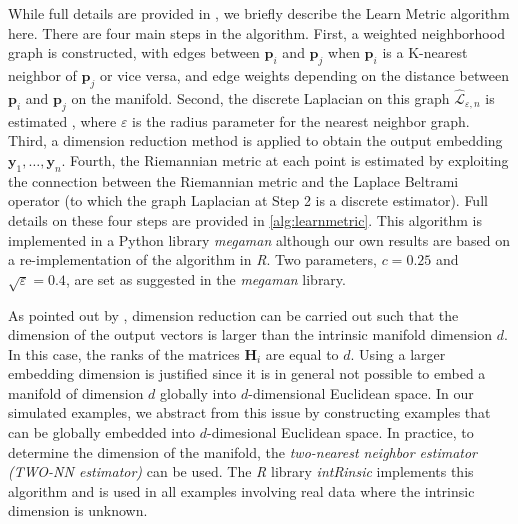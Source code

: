\documentclass[11pt,a4paper,]{article}
\begin{document}
While full details are provided in \textcite{Perrault-Joncas2013-pq}, we briefly describe the Learn Metric algorithm here. There are four main steps in the algorithm. First, a weighted neighborhood graph is constructed, with edges between \(\pmb{p}_i\) and \(\pmb{p}_j\) when \(\pmb{p}_i\) is a K-nearest neighbor of \(\pmb{p}_j\) or vice versa, and edge weights depending on the distance between \(\pmb{p}_i\) and \(\pmb{p}_j\) on the manifold. Second, the discrete Laplacian on this graph \(\hat{\mathcal{L}}_{\varepsilon,n}\) is estimated \autocite{Zhou2011-za}, where \(\varepsilon\) is the radius parameter for the nearest neighbor graph. Third, a dimension reduction method is applied to obtain the output embedding \(\pmb{y}_1,\dots,\pmb{y}_n\). Fourth, the Riemannian metric at each point is estimated by exploiting the connection between the Riemannian metric and the Laplace Beltrami operator (to which the graph Laplacian at Step 2 is a discrete estimator). Full details on these four steps are provided in \autoref{alg:learnmetric}. This algorithm is implemented in a Python library \emph{megaman} \autocite{McQueen2016-xz} although our own results are based on a re-implementation of the algorithm in \emph{R}. Two parameters, \(c=0.25\) and \(\sqrt{\varepsilon} = 0.4\), are set as suggested in the \emph{megaman} library.

As pointed out by \textcite{Perrault-Joncas2013-pq}, dimension reduction can be carried out such that the dimension of the output vectors is larger than the intrinsic manifold dimension \(d\). In this case, the ranks of the matrices \(\pmb{H}_i\) are equal to \(d\). Using a larger embedding dimension is justified since it is in general not possible to embed a manifold of dimension \(d\) globally into \(d\)-dimensional Euclidean space. In our simulated examples, we abstract from this issue by constructing examples that can be globally embedded into \(d\)-dimesional Euclidean space. In practice, to determine the dimension of the manifold, the \emph{two-nearest neighbor estimator (TWO-NN estimator)} \autocite{Facco2017-rl,Denti2021-jl} can be used. The \emph{R} library \emph{intRinsic} \autocite{Denti2021-qc} implements this algorithm and is used in all examples involving real data where the intrinsic dimension is unknown.
\end{document}

